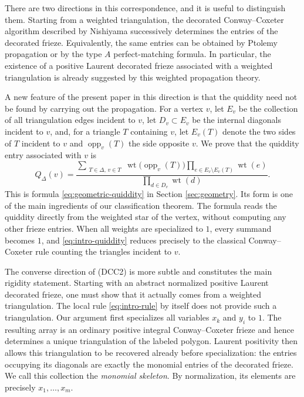 \documentclass[amstex,11pt,reqno]{amsart}
\theoremstyle{definition}
\newcommand{\wt}{\operatorname{wt}}
\begin{document}
There are two directions in this correspondence, and it is useful to
distinguish them. Starting from a weighted triangulation, the decorated
Conway--Coxeter algorithm described by Nishiyama
\cite[Chapter~11]{Nishiyama2022} successively determines the entries of
the decorated frieze. Equivalently, the same entries can be obtained by
Ptolemy propagation or by the type $A$ perfect-matching formula. In
particular, the existence of a positive Laurent decorated frieze
associated with a weighted triangulation is already suggested by this
weighted propagation theory.

A new feature of the present paper in this direction is that the
quiddity need not be found by carrying out the propagation. For a
vertex $v$, let $E_v$ be the collection of all triangulation edges
incident to $v$, let $D_v\subset E_v$ be the internal diagonals
incident to $v$, and, for a triangle $T$ containing $v$, let
$E_v(T)$ denote the two sides of $T$ incident to $v$ and
$\operatorname{opp}_v(T)$ the side opposite $v$. We prove that the
quiddity entry associated with $v$ is
\begin{equation}\label{eq:intro-quiddity}
 Q_\Delta(v)=
 \frac{
 \displaystyle
 \sum_{\substack{T\in\Delta,\, v\in T}}
 \wt\bigl(\operatorname{opp}_v(T)\bigr)
 \prod_{e\in E_v\setminus E_v(T)}\wt(e)}
 {\displaystyle\prod_{d\in D_v}\wt(d)}.
\end{equation}
This is formula \eqref{eq:geometric-quiddity} in Section \ref{sec:geometry}. 
Its form is one of
the main ingredients of our classification theorem. 
The
formula reads the quiddity directly from the weighted star of the
vertex, without computing any other frieze entries. When all weights
are specialized to $1$, every summand becomes $1$, and
\eqref{eq:intro-quiddity} reduces precisely to the classical
Conway--Coxeter rule counting the triangles incident to $v$.

The converse direction of (DCC2) is more subtle and constitutes the
main rigidity statement. Starting with an abstract normalized positive
Laurent decorated frieze, one must show that it actually comes from a
weighted triangulation. The local rule \eqref{eq:intro-rule} by itself
does not provide such a triangulation. Our argument first specializes
all variables $x_k$ and $y_i$ to $1$. The resulting array is an
ordinary positive integral Conway--Coxeter frieze and hence determines
a unique triangulation of the labeled polygon. Laurent positivity then
allows this triangulation to be recovered already before specialization:
the entries occupying its diagonals are exactly the monomial entries of
the decorated frieze. We call this collection the \emph{monomial
skeleton}. By normalization, its elements are precisely
$x_1,\ldots,x_m$.
\end{document}
